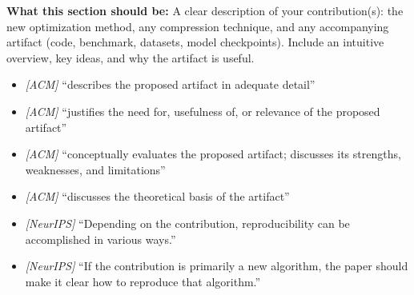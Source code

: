 \noindent\textbf{What this section should be:}
A clear description of your contribution(s): the new optimization method, any compression technique, and any accompanying artifact (code, benchmark, datasets, model checkpoints). Include an intuitive overview, key ideas, and why the artifact is useful.
\begin{itemize}
  \item \textit{[ACM]} ``describes the proposed artifact in adequate detail''
  \item \textit{[ACM]} ``justifies the need for, usefulness of, or relevance of the proposed artifact''
  \item \textit{[ACM]} ``conceptually evaluates the proposed artifact; discusses its strengths, weaknesses, and limitations''
  \item \textit{[ACM]} ``discusses the theoretical basis of the artifact''
  \item \textit{[NeurIPS]} ``Depending on the contribution, reproducibility can be accomplished in various ways.''
  \item \textit{[NeurIPS]} ``If the contribution is primarily a new algorithm, the paper should make it clear how to reproduce that algorithm.''
\end{itemize}